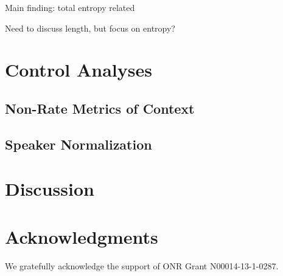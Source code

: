 \documentclass[11pt,letterpaper]{article}
\begin{document}
Main finding: total entropy related 

Need to discuss length, but focus on entropy?


\section{Control Analyses}

\subsection{Non-Rate Metrics of Context}

\subsection{Speaker Normalization}




\section{Discussion}


\section*{Acknowledgments}

We gratefully acknowledge the support of ONR Grant N00014-13-1-0287.



\end{document}
